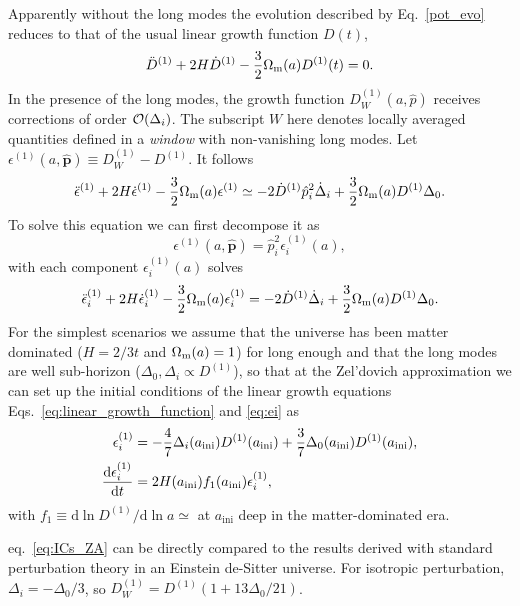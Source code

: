 \documentclass[a4paper,11pt]{article}
\renewcommand{\d}{\mathrm{d}}
\newcommand{\vp}{{\bm p}}
\begin{document}
Apparently without the long modes the evolution described by Eq.~\eqref{pot_evo} reduces to
that of the usual linear growth function $D(t)$,
\begin{align}
    \ddot{D}^{(1)} + 2H\dot{D}^{(1)} -\frac{3}{2}\Omega_{\rm m}(a)D^{(1)}{(t)}=0.
    \label{eq:linear_growth_function}
\end{align}
In the presence of the long modes, the growth function $D^{(1)}_W(a, \hat{p})$
receives corrections of order ${\cal O}(\Delta_i)$.
The subscript $W$ here
denotes locally averaged quantities
defined in a \emph{window} with non-vanishing long modes.
Let $\epsilon^{(1)}(a, \hat{\vp}) \equiv D^{(1)}_W - D^{(1)}$. It follows
\begin{equation}
    \ddot \epsilon^{(1)} +2H \dot \epsilon^{(1)}
    - \frac32 \Omega_{\rm m}(a) \epsilon^{(1)}
    \simeq
    - 2\dot D^{(1)} \hat p_i^2 \dot \Delta_i + \frac32 \Omega_{\rm m}(a) D^{(1)} \Delta_0.
\end{equation}
To solve this equation we can first decompose it as
\begin{equation}
    \epsilon^{(1)}(a, \hat{\vp}) = \hat p_i^2 \epsilon^{(1)}_i(a),
    \label{e}
\end{equation}
with each component $\epsilon^{(1)}_i(a)$ solves
\begin{equation}
    \ddot \epsilon_i^{(1)} + 2H \dot \epsilon_i^{(1)}
    - \frac32 \Omega_{\rm m}(a)\epsilon_i^{(1)}
    = - 2 \dot D^{(1)} \dot \Delta_i + \frac32 \Omega_{\rm m}(a) D^{(1)} \Delta_0.
    \label{eq:ei}
\end{equation}
For the simplest scenarios we assume that the universe has been matter
dominated ($H = 2/3t$ and $\Omega_{\rm m}(a) = 1$) for long enough and
that the long modes are well sub-horizon ($\Delta_0, \Delta_i \propto D^{(1)}$), so
that at the Zel'dovich approximation we can set up the initial conditions of the linear growth equations
Eqs.~\eqref{eq:linear_growth_function} and \eqref{eq:ei} as
\begin{align}
    \epsilon^{(1)}_i &=
    -\frac47 \Delta_i(a_\mathrm{ini}) D^{(1)}(a_\mathrm{ini}) + \frac37 \Delta_0(a_\mathrm{ini}) D^{(1)}(a_\mathrm{ini}),
    \nonumber\\
    \frac{\d \epsilon^{(1)}_i}{\d t} &= 2 H(a_{\rm ini})f_1(a_{\rm ini})\epsilon^{(1)}_i,
    \label{eq:ICs_ZA}
\end{align}
with $f_1\equiv \d \ln D^{(1)}/\d \ln a \simeq $
at $a_\mathrm{ini}$ deep in the matter-dominated era.

eq.~\eqref{eq:ICs_ZA} can be directly compared to the results derived with standard
perturbation theory in an Einstein de-Sitter universe.
For isotropic perturbation, $\Delta_i = - \Delta_0 / 3$, so $D^{(1)}_W = D^{(1)} (1 + 13
\Delta_0 / 21)$.
\end{document}
